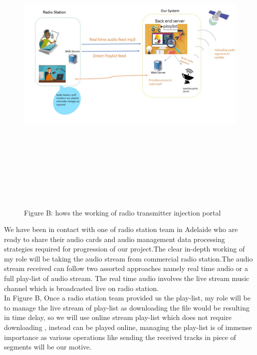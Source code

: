 \begin{figure}
\begin{centering}
\includegraphics[width=15cm,height=15cm,keepaspectratio]{Figures/1.jpg}
\caption{Figure B: hows the working of radio transmitter injection portal}
\label{radio-transmitter-injection-portal}
\end{centering}
\end{figure}

We have been in contact with one of radio station team in Adelaide who are ready to share their audio cards and audio management data processing strategies required for progression of our project.The clear in-depth working of my role will be taking the audio stream from commercial radio station.The audio stream received can follow two assorted approaches namely real time audio or a full play-list of audio stream. The real time audio involves the live stream music channel which is broadcasted live on radio station.\\

In Figure B, Once a radio station team provided us the play-list, my role will be to manage the  live stream of play-list as downloading the file would be resulting in time delay, so we will use online stream play-list which does not require downloading , instead can be played online, managing the  play-list is of immense importance as various operations like sending the received tracks in piece of segments  will be our motive.\\

